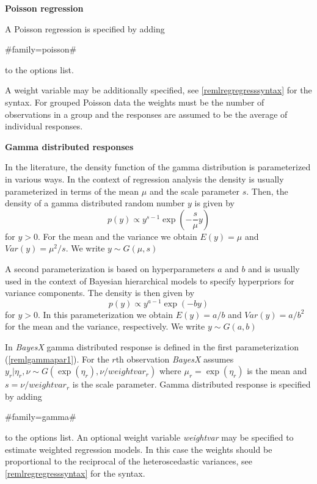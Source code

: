{\bf Poisson regression}

A Poisson regression is specified by adding

#family=poisson#

to the options list.

A weight variable may be additionally specified, see
\autoref{remlregregresssyntax} for the syntax. For grouped Poisson
data the weights must be the number of observations in a group and
the responses are assumed to be the average of individual
responses.

{\bf Gamma distributed responses}

In the literature, the density function of the gamma distribution
is parameterized in various ways. In the context of regression
analysis the density is usually parameterized in terms of the mean
$\mu$ and the scale parameter $s$. Then, the density of a gamma
distributed random number $y$ is given by
\begin{equation}
\label{remlgammapar1} p(y) \propto y^{s-1}\exp(-\frac{s}{\mu} y)
\end{equation}
for $y > 0$. For the mean and the variance we obtain $E(y) = \mu$
and $Var(y) = \mu^2/s$. We write $y \sim G(\mu,s)$

A second parameterization is based on hyperparameters $a$ and $b$
and is usually used in the context of Bayesian hierarchical models
to specify hyperpriors for variance components. The density is
then given by
\begin{equation}
\label{remlgammapar2} p(y) \propto y^{a-1}\exp(-b y)
\end{equation}
for $y>0$. In this parameterization we obtain $E(y) = a/b$ and
$Var(y) = a/b^2$ for the mean and the variance, respectively. We
write $y \sim G(a,b)$

In {\em BayesX} gamma distributed response is defined in the first
parameterization (\ref{remlgammapar1}). For the $r$th observation
{\em BayesX} assumes  $y_r | \eta_r,\nu \sim
G(\exp(\eta_r),\nu/weightvar_r)$ where $\mu_r = \exp(\eta_r)$ is
the mean and $s=\nu/weightvar_r$ is the scale parameter. Gamma
distributed response is specified by adding

#family=gamma#

to the options list. An optional weight variable {\em weightvar}
may be specified to estimate weighted regression models. In this
case the weights should be proportional to the reciprocal of the
heteroscedastic variances, see \autoref{remlregregresssyntax} for
the syntax.


